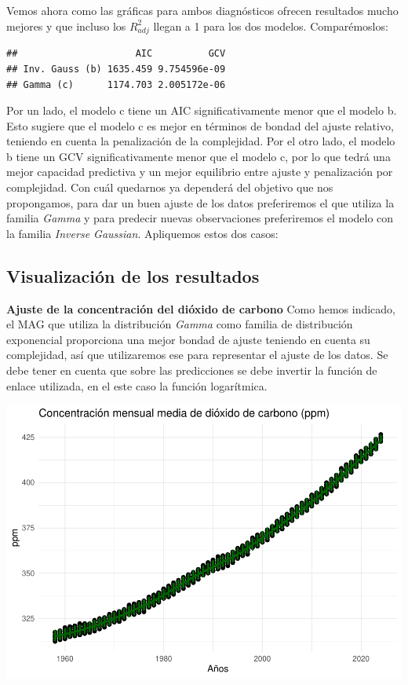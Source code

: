 \documentclass[12pt,a4paper,]{book}
\numberwithin{dummy}{section}
\theoremstyle{ocrenumbox}
\theoremstyle{blacknumex}
\theoremstyle{blacknumbox}
\theoremstyle{ocrenum}
\theoremstyle{ocrenum}
\begin{document}
Vemos ahora como las gráficas para ambos diagnósticos ofrecen resultados
mucho mejores y que incluso los \(R^2_{adj}\) llegan a 1 para los dos
modelos. Comparémoslos:

\begin{verbatim}
##                     AIC          GCV
## Inv. Gauss (b) 1635.459 9.754596e-09
## Gamma (c)      1174.703 2.005172e-06
\end{verbatim}

Por un lado, el modelo c tiene un AIC significativamente menor que el
modelo b. Esto sugiere que el modelo c es mejor en términos de bondad
del ajuste relativo, teniendo en cuenta la penalización de la
complejidad. Por el otro lado, el modelo b tiene un GCV
significativamente menor que el modelo c, por lo que tedrá una mejor
capacidad predictiva y un mejor equilibrio entre ajuste y penalización
por complejidad. Con cuál quedarnos ya dependerá del objetivo que nos
propongamos, para dar un buen ajuste de los datos preferiremos el que
utiliza la familia \emph{Gamma} y para predecir nuevas observaciones
preferiremos el modelo con la familia \emph{Inverse Gaussian}.
Apliquemos estos dos casos:

\hypertarget{visualizaciuxf3n-de-los-resultados-1}{%
\subsection{Visualización de los
resultados}\label{visualizaciuxf3n-de-los-resultados-1}}

\textbf{Ajuste de la concentración del dióxido de carbono} \newline Como
hemos indicado, el MAG que utiliza la distribución \emph{Gamma} como
familia de distribución exponencial proporciona una mejor bondad de
ajuste teniendo en cuenta su complejidad, así que utilizaremos ese para
representar el ajuste de los datos. Se debe tener en cuenta que sobre
las predicciones se debe invertir la función de enlace utilizada, en el
este caso la función logarítmica.

\begin{center}\includegraphics[width=0.95\linewidth]{figurasR/unnamed-chunk-31-1} \end{center}
\end{document}
